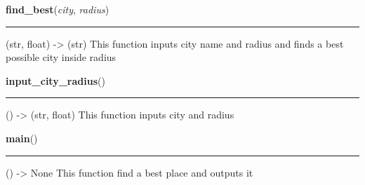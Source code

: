     \label{read_csv:find_best}

    \vspace{0.5ex}

\hspace{.8\funcindent}\begin{boxedminipage}{\funcwidth}

    \raggedright \textbf{find\_best}(\textit{city}, \textit{radius})

    \vspace{-1.5ex}

    \rule{\textwidth}{0.5\fboxrule}
\setlength{\parskip}{2ex}
    (str, float) -{\textgreater} (str) This function inputs city name and 
    radius and finds a best possible city inside radius

\setlength{\parskip}{1ex}
    \end{boxedminipage}

    \label{read_csv:input_city_radius}

    \vspace{0.5ex}

\hspace{.8\funcindent}\begin{boxedminipage}{\funcwidth}

    \raggedright \textbf{input\_city\_radius}()

    \vspace{-1.5ex}

    \rule{\textwidth}{0.5\fboxrule}
\setlength{\parskip}{2ex}
    () -{\textgreater} (str, float) This function inputs city and radius

\setlength{\parskip}{1ex}
    \end{boxedminipage}

    \label{read_csv:main}

    \vspace{0.5ex}

\hspace{.8\funcindent}\begin{boxedminipage}{\funcwidth}

    \raggedright \textbf{main}()

    \vspace{-1.5ex}

    \rule{\textwidth}{0.5\fboxrule}
\setlength{\parskip}{2ex}
    () -{\textgreater} None This function find a best place and outputs it

\setlength{\parskip}{1ex}
    \end{boxedminipage}

